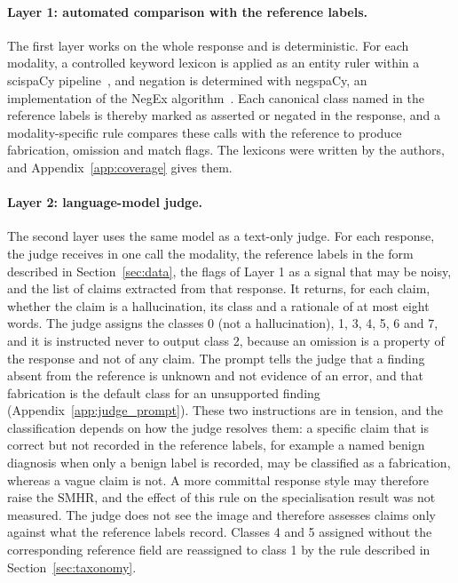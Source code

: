 \documentclass[11pt,a4paper]{article}
\newcommand{\SMHR}{\ensuremath{\mathrm{SMHR}}}
\begin{document}
\paragraph{Layer 1: automated comparison with the reference labels.} The first layer works on the whole response and is deterministic. For each modality, a controlled keyword lexicon is applied as an entity ruler within a scispaCy pipeline~\citep{neumann2019scispacy}, and negation is determined with negspaCy, an implementation of the NegEx algorithm~\citep{chapman2001simple}. Each canonical class named in the reference labels is thereby marked as asserted or negated in the response, and a modality-specific rule compares these calls with the reference to produce fabrication, omission and match flags. The lexicons were written by the authors, and Appendix~\ref{app:coverage} gives them.

\paragraph{Layer 2: language-model judge.} The second layer uses the same model as a text-only judge. For each response, the judge receives in one call the modality, the reference labels in the form described in Section~\ref{sec:data}, the flags of Layer 1 as a signal that may be noisy, and the list of claims extracted from that response. It returns, for each claim, whether the claim is a hallucination, its class and a rationale of at most eight words. The judge assigns the classes 0 (not a hallucination), 1, 3, 4, 5, 6 and 7, and it is instructed never to output class 2, because an omission is a property of the response and not of any claim. The prompt tells the judge that a finding absent from the reference is unknown and not evidence of an error, and that fabrication is the default class for an unsupported finding (Appendix~\ref{app:judge_prompt}). These two instructions are in tension, and the classification depends on how the judge resolves them: a specific claim that is correct but not recorded in the reference labels, for example a named benign diagnosis when only a benign label is recorded, may be classified as a fabrication, whereas a vague claim is not. A more committal response style may therefore raise the \SMHR{}, and the effect of this rule on the specialisation result was not measured. The judge does not see the image and therefore assesses claims only against what the reference labels record. Classes 4 and 5 assigned without the corresponding reference field are reassigned to class 1 by the rule described in Section~\ref{sec:taxonomy}.
\end{document}
